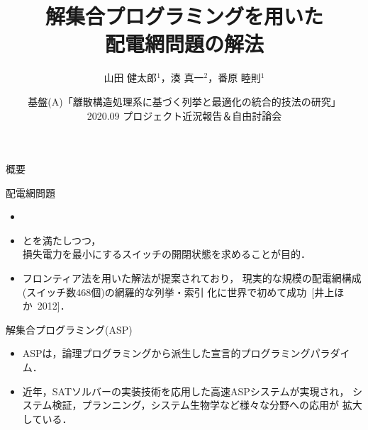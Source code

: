 \documentclass[dvipdfmx,11pt]{beamer}
\title{解集合プログラミングを用いた\\配電網問題の解法}
\author[山田 健太郎，湊 真一，番原 睦則]{山田 健太郎$^1$，湊 真一$^2$，番原 睦則$^1$}
\date{\small 基盤(A)「離散構造処理系に基づく列挙と最適化の統合的技法の研究」\\
2020.09 プロジェクト近況報告＆自由討論会}
\institute{1.名古屋大学 大学院情報学研究科 \\ 2.京都大学 大学院情報学研究科}
\begin{document}
\begin{frame}{}
  \titlepage
\end{frame}

\begin{frame}{概要}

\begin{block}{配電網問題}
\begin{itemize}
 \item {}
 \item {}とを満たしつつ， \\
	   損失電力を最小にするスイッチの開閉状態を求めることが目的．
 \item フロンティア法を用いた解法が提案されており，
	   現実的な規模の配電網構成(スイッチ数468個)の網羅的な列挙・索引
	   化に世界で初めて成功~[井上ほか~2012]．
\end{itemize} 
\end{block}
\vfill
\begin{alertblock}{解集合プログラミング(ASP)}
 \begin{itemize}
  \item ASPは，論理プログラミングから派生した宣言的プログラミングパラダイム．
  \item 近年，SATソルバーの実装技術を応用した高速ASPシステムが実現され，
    システム検証，プランニング，システム生物学など様々な分野への応用が
    拡大している．
 \end{itemize}
\end{alertblock}
\end{frame}
\end{document}
